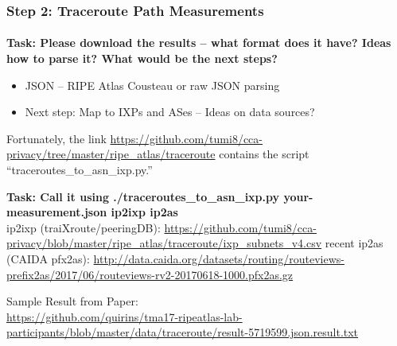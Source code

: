 \begin{frame}
\frametitle{Step 2: Traceroute Path Measurements}
\framesubtitle{}
\textbf{Task: Please download the results -- what format does it have? Ideas how to parse it? What would be the next steps?}
\pause
\begin{itemize}
	\item JSON -- RIPE Atlas Cousteau or raw JSON parsing
	\item Next step: Map to IXPs and ASes -- Ideas on data sources?
\end{itemize}
\pause
Fortunately, the link \url{https://github.com/tumi8/cca-privacy/tree/master/ripe_atlas/traceroute} contains the script ``traceroutes\_to\_asn\_ixp.py.''

\textbf{Task: Call it using ./traceroutes\_to\_asn\_ixp.py your-measurement.json ip2ixp ip2as}\\

ip2ixp (traiXroute/peeringDB): \url{https://github.com/tumi8/cca-privacy/blob/master/ripe_atlas/traceroute/ixp_subnets_v4.csv}
recent ip2as (CAIDA pfx2as): \url{http://data.caida.org/datasets/routing/routeviews-prefix2as/2017/06/routeviews-rv2-20170618-1000.pfx2as.gz}

Sample Result from Paper:\\ \url{https://github.com/quirins/tma17-ripeatlas-lab-participants/blob/master/data/traceroute/result-5719599.json.result.txt}

\end{frame}
\clearpage
